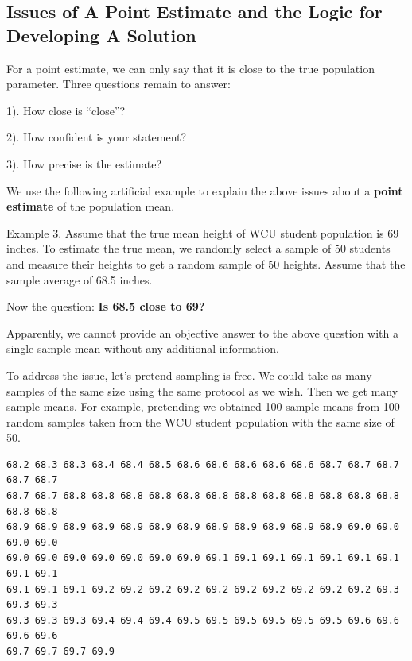 \documentclass[
]{book}
\begin{document}
\hfill\break

\hypertarget{issues-of-a-point-estimate-and-the-logic-for-developing-a-solution}{%
\subsection{Issues of A Point Estimate and the Logic for Developing A Solution}\label{issues-of-a-point-estimate-and-the-logic-for-developing-a-solution}}

For a point estimate, we can only say that it is close to the true population parameter. Three questions remain to answer:

1). How close is ``close''?

2). How confident is your statement?

3). How precise is the estimate?

We use the following artificial example to explain the above issues about a \textbf{point estimate} of the population mean.

Example 3. Assume that the true mean height of WCU student population is 69 inches. To estimate the true mean, we randomly select a sample of 50 students and measure their heights to get a random sample of 50 heights. Assume that the sample average of 68.5 inches.

Now the question: \textbf{Is 68.5 close to 69? }

Apparently, we cannot provide an objective answer to the above question with a single sample mean without any additional information.

To address the issue, let's pretend sampling is free. We could take as many samples of the same size using the same protocol as we wish. Then we get many sample means. For example, pretending we obtained 100 sample means from 100 random samples taken from the WCU student population with the same size of 50.

\begin{verbatim}
68.2 68.3 68.3 68.4 68.4 68.5 68.6 68.6 68.6 68.6 68.6 68.7 68.7 68.7 68.7 68.7 
68.7 68.7 68.8 68.8 68.8 68.8 68.8 68.8 68.8 68.8 68.8 68.8 68.8 68.8 68.8 68.8 
68.9 68.9 68.9 68.9 68.9 68.9 68.9 68.9 68.9 68.9 68.9 68.9 69.0 69.0 69.0 69.0
69.0 69.0 69.0 69.0 69.0 69.0 69.0 69.1 69.1 69.1 69.1 69.1 69.1 69.1 69.1 69.1 
69.1 69.1 69.1 69.2 69.2 69.2 69.2 69.2 69.2 69.2 69.2 69.2 69.2 69.3 69.3 69.3 
69.3 69.3 69.3 69.4 69.4 69.4 69.5 69.5 69.5 69.5 69.5 69.5 69.6 69.6 69.6 69.6
69.7 69.7 69.7 69.9
\end{verbatim}
\end{document}
